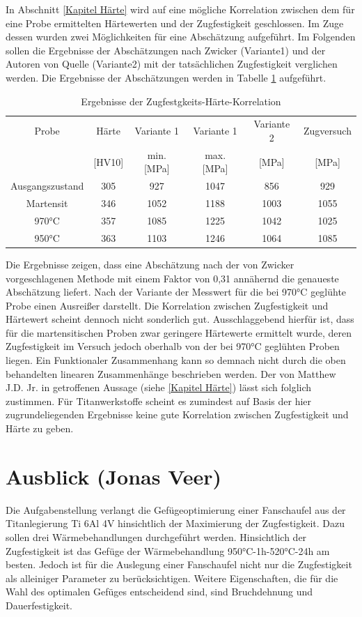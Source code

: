 \documentclass[a4paper, 11pt]{tubsreprt}
\begin{document}
In Abschnitt \ref{Kapitel Härte} wird auf eine mögliche Korrelation zwischen dem für eine Probe ermittelten Härtewerten und der Zugfestigkeit geschlossen. Im Zuge dessen wurden zwei Möglichkeiten für eine Abschätzung aufgeführt. Im Folgenden sollen die Ergebnisse der Abschätzungen nach Zwicker \cite{Zwicker1974} (Variante1) und der Autoren von Quelle \cite{Luetjering2007} (Variante2) mit der tatsächlichen Zugfestigkeit verglichen werden. 
Die Ergebnisse der Abschätzungen werden in Tabelle \ref{Tabelle Zugfestigkeits härte korrelation} aufgeführt.
\begin{table}
\begin{tabular}{c|c|c|c|c|c}
Probe & Härte  & Variante 1  & Variante 1  & Variante 2 & Zugversuch  \\
& [HV10] & min. [MPa] & max. [MPa] & [MPa] & [MPa]\\
\hline
Ausgangszustand & 305 & 927 & 1047 & 856 & 929 \\
\hline
Martensit & 346 & 1052 & 1188 & 1003 & 1055 \\
\hline
970°C & 357 & 1085 & 1225 & 1042 & 1025 \\
\hline
950°C & 363 & 1103 & 1246& 1064 & 1085 \\
\end{tabular}
\caption{Ergebnisse der Zugfestgkeits-Härte-Korrelation}
\label{Tabelle Zugfestigkeits härte korrelation}
\end{table}
Die Ergebnisse zeigen, dass eine Abschätzung nach der von Zwicker vorgeschlagenen Methode mit einem Faktor von 0,31 annähernd die genaueste Abschätzung liefert. Nach der Variante der Messwert für die bei 970°C geglühte Probe einen Ausreißer darstellt. Die Korrelation zwischen Zugfestigkeit und Härtewert scheint dennoch nicht sonderlich gut. Ausschlaggebend hierfür ist, dass für die martensitischen Proben zwar geringere Härtewerte ermittelt wurde, deren Zugfestigkeit im Versuch jedoch oberhalb von der bei 970°C geglühten Proben liegen. Ein Funktionaler Zusammenhang kann so demnach nicht durch die oben behandelten linearen Zusammenhänge beschrieben werden. Der von Matthew J.D. Jr. in \cite{Donachie2001} getroffenen Aussage (siehe \ref{Kapitel Härte}) lässt sich folglich zustimmen. Für Titanwerkstoffe scheint es zumindest auf Basis der hier zugrundeliegenden Ergebnisse keine gute Korrelation zwischen Zugfestigkeit und Härte zu geben.
\chapter{Ausblick (Jonas Veer)}
Die Aufgabenstellung verlangt die Gefügeoptimierung einer Fanschaufel aus der Titanlegierung Ti 6Al 4V hinsichtlich der Maximierung der Zugfestigkeit. Dazu sollen drei Wärmebehandlungen durchgeführt werden. Hinsichtlich der Zugfestigkeit ist das Gefüge der Wärmebehandlung 950°C-1h-520°C-24h am besten.
Jedoch ist für die Auslegung einer Fanschaufel nicht nur die Zugfestigkeit als alleiniger Parameter zu berücksichtigen. Weitere Eigenschaften, die für die Wahl des optimalen Gefüges entscheidend sind, sind Bruchdehnung und Dauerfestigkeit.
\end{document}
